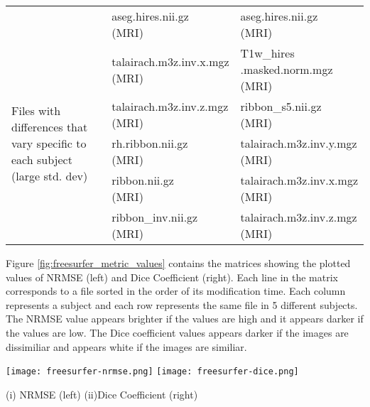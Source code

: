 \begin{center}
\begin{longtable}{|p{}|p{}|p{}|}
& \makecell[l]{aseg.hires.nii.gz\\(MRI)}  & \makecell[l]{aseg.hires.nii.gz\\(MRI)} \\\cline{1-3}
\multirow{5}{.3\textwidth}{Files with differences that vary specific to each subject (large std. dev)}   & \makecell[l]{talairach.m3z.inv.x.mgz\\(MRI)}  & \makecell[l]{T1w\_hires\\.masked.norm.mgz\\(MRI)} \\\cline{2-3}
& \makecell[l]{talairach.m3z.inv.z.mgz\\(MRI)}                 & \makecell[l]{ribbon\_s5.nii.gz\\(MRI)} \\\cline{2-3}
& \makecell[l]{rh.ribbon.nii.gz\\(MRI)}                                                            & \makecell[l]{talairach.m3z.inv.y.mgz\\(MRI)} \\\cline{2-3}
& \makecell[l]{ribbon.nii.gz\\(MRI)}                   & \makecell[l]{talairach.m3z.inv.x.mgz\\(MRI)} \\\cline{2-3}
& \makecell[l]{ribbon\_inv.nii.gz\\(MRI)}                                                   & \makecell[l]{talairach.m3z.inv.z.mgz\\(MRI)} \\\cline{1-3}
\end{longtable}
\label{tab:FreeSurfer_comparison_table}
\end{center}
\hfill \break
\fi

Figure \ref{fig:freesurfer_metric_values} contains the matrices showing the plotted values of NRMSE (left) and Dice Coefficient (right). Each line in the matrix corresponds to a file sorted in the order of its modification time. Each column represents a subject and each row represents the same file in 5 different subjects. The NRMSE value appears brighter if the values are high and it appears darker if the values are low. The Dice coefficient values appears darker if the images are dissimiliar and appears white if the images are similiar.

\begin{center}
\texttt{[image: freesurfer-nrmse.png]}%
\texttt{[image: freesurfer-dice.png]}
\caption*{(i) NRMSE (left) (ii)Dice Coefficient (right)}
\label{fig:freesurfer_metric_values}
\end{center}

